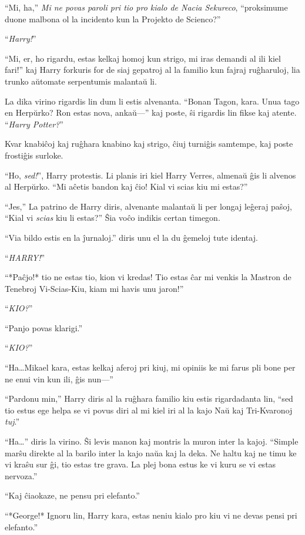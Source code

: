 ``Mi, ha,'' \emph{Mi ne povas paroli pri tio pro kialo de Nacia
Sekureco}, ``proksimume duone malbona ol la incidento kun la
Projekto de Scienco?''

``\emph{Harry!}''

  ``Mi, er, ho rigardu, estas kelkaj homoj kun strigo, mi iras demandi
al ili kiel fari!'' kaj Harry forkuris for de siaj gepatroj al la
familio kun fajraj ruĝharuloj, lia trunko aŭtomate serpentumis
malantaŭ li.

La dika virino rigardis lin dum li estis alvenanta. ``Bonan Tagon,
kara. Unua tago en Herpŭrko? Ron estas nova, ankaŭ—'' kaj poste, ŝi
rigardis lin fikse kaj atente. ``\emph{Harry Potter?}''

Kvar knabiĉoj kaj ruĝhara knabino kaj strigo, ĉiuj turniĝis samtempe,
kaj poste frostiĝis surloke.

``Ho, \emph{sed!}'', Harry protestis. Li planis iri kiel Harry Verres,
almenaŭ ĝis li alvenos al Herpŭrko. ``Mi aĉetis bandon kaj ĉio! Kial
vi scias kiu mi estas?''

``Jes,'' La patrino de Harry diris, alvenante malantaŭ li per longaj
leĝeraj paŝoj, ``Kial vi \emph{scias} kiu li estas?'' Ŝia voĉo indikis
certan timegon.

``Via bildo estis en la ĵurnaloj.'' diris unu el la du ĝemeloj tute
identaj.

``\emph{HARRY!}''

``*Paĉjo!* tio ne estas tio, kion vi kredas! Tio estas ĉar mi venkis la
Mastron de Tenebroj Vi-Scias-Kiu, kiam mi havis unu jaron!''

``\emph{KIO?}''

``Panjo povas klarigi.''

``\emph{KIO?}''

``Ha\ldots Mikael kara, estas kelkaj aferoj pri kiuj, mi opiniis ke mi
farus pli bone per ne enui vin kun ili, ĝis nun—''

``Pardonu min,'' Harry diris al la ruĝhara familio kiu estis
rigardadanta lin, ``sed tio estus ege helpa se vi povus diri al mi
kiel iri al la kajo Naŭ kaj Tri-Kvaronoj \emph{tuj}.''

``Ha\ldots'' diris la virino. Ŝi levis manon kaj montris la muron
inter la kajoj. ``Simple marŝu direkte al la barilo inter la kajo naŭa
kaj la deka. Ne haltu kaj ne timu ke vi kraŝu sur ĝi, tio estas tre
grava. La plej bona estus ke vi kuru se vi estas nervoza.''

``Kaj ĉiaokaze, ne pensu pri elefanto.''

``*George!* Ignoru lin, Harry kara, estas neniu kialo pro kiu vi ne
devas pensi pri elefanto.''

